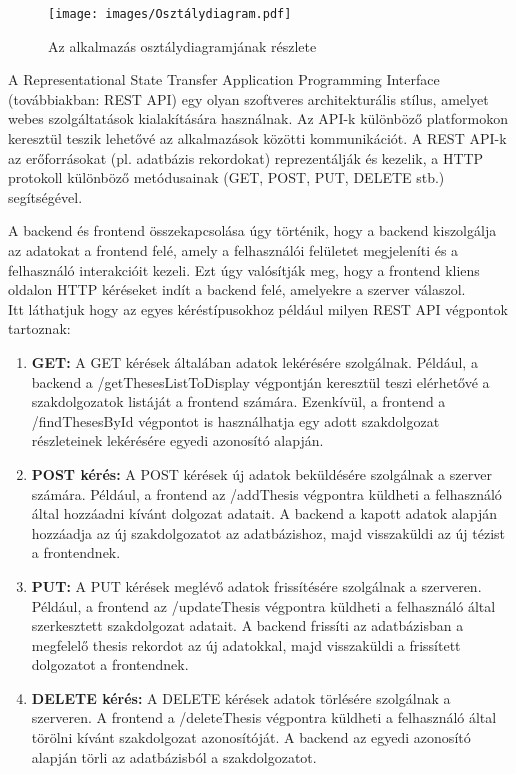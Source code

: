 \begin{figure}[ht]
	\texttt{[image: images/Osztálydiagram.pdf]}
	\caption{Az alkalmazás osztálydiagramjának részlete}
	\label{fig:Osztálydiagram}
\end{figure}




A Representational State Transfer Application Programming Interface (továbbiakban: REST API)\cite{REST API} egy olyan szoftveres architekturális stílus, amelyet webes szolgáltatások kialakítására használnak. Az API-k különböző platformokon keresztül teszik lehetővé az alkalmazások közötti kommunikációt. A REST API-k\cite{REST API} az erőforrásokat (pl. adatbázis rekordokat) reprezentálják és kezelik, a HTTP\cite{http} protokoll különböző metódusainak (GET, POST, PUT, DELETE stb.) segítségével.

A backend és frontend összekapcsolása úgy történik, hogy a backend kiszolgálja az adatokat a frontend felé, amely a felhasználói felületet megjeleníti és a felhasználó interakcióit kezeli. Ezt úgy valósítják meg, hogy a frontend kliens oldalon HTTP\cite{http} kéréseket indít a backend felé, amelyekre a szerver válaszol.\\

Itt láthatjuk hogy az egyes kéréstípusokhoz például milyen REST API végpontok tartoznak:

\begin{enumerate}

\item{\textbf{GET:}}
A GET kérések általában adatok lekérésére szolgálnak. Például, a backend a /getThesesListToDisplay végpontján keresztül teszi elérhetővé a szakdolgozatok listáját a frontend számára. Ezenkívül, a frontend a /findThesesById végpontot is használhatja egy adott szakdolgozat részleteinek lekérésére egyedi azonosító alapján.

\item{\textbf{POST kérés:}}
A POST kérések új adatok beküldésére szolgálnak a szerver számára. Például, a frontend az /addThesis végpontra küldheti a felhasználó által hozzáadni kívánt dolgozat adatait. A backend a kapott adatok alapján hozzáadja az új szakdolgozatot az adatbázishoz, majd visszaküldi az új tézist a frontendnek.

\item{\textbf{PUT:}}
A PUT kérések meglévő adatok frissítésére szolgálnak a szerveren. Például, a frontend az /updateThesis végpontra küldheti a felhasználó által szerkesztett szakdolgozat adatait. A backend frissíti az adatbázisban a megfelelő thesis rekordot az új adatokkal, majd visszaküldi a frissített dolgozatot a frontendnek.

\item{\textbf{DELETE kérés:}}
A DELETE kérések adatok törlésére szolgálnak a szerveren. A frontend a /deleteThesis végpontra küldheti a felhasználó által törölni kívánt szakdolgozat azonosítóját. A backend az egyedi azonosító alapján törli az adatbázisból a szakdolgozatot.

\end{enumerate}


